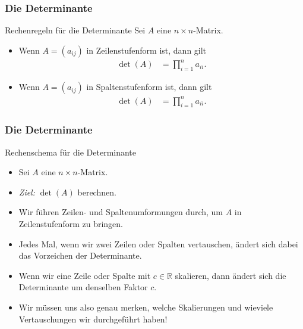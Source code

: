 \documentclass{beamer}
\renewcommand{\emph}[1]{{\textcolor{solarizedRed}{\itshape #1}}}
\newcommand\RR{\mathbb R}
\renewcommand{\ae}{\"a}
\newcommand{\ue}{\"u}
\newcommand{\mytitle}{Die Determinante}
\begin{document}
\begin{frame}\frametitle{\mytitle}
	\begin{block}{Rechenregeln f\ue r die Determinante}
		Sei $A$ eine $n\times n$-Matrix.
		\begin{itemize}
			\item Wenn $A=(a_{ij})$ in Zeilenstufenform ist, dann gilt
				\begin{align*}
					\det(A)&=\prod_{i=1}^na_{ii}.
				\end{align*}
			\item Wenn $A=(a_{ij})$ in Spaltenstufenform ist, dann gilt
				\begin{align*}
					\det(A)&=\prod_{i=1}^na_{ii}.
				\end{align*}
		\end{itemize}
	\end{block}
\end{frame}

\begin{frame}\frametitle{\mytitle}
	\begin{block}{Rechenschema f\ue r die Determinante}
		\begin{itemize}
			\item Sei $A$ eine $n\times n$-Matrix.
			\item \emph{Ziel:} $\det(A)$ berechnen.
			\item Wir f\ue hren Zeilen- und Spaltenumformungen durch, um $A$ in Zeilenstufenform zu bringen.
			\item Jedes Mal, wenn wir zwei Zeilen oder Spalten vertauschen, \ae ndert sich dabei das Vorzeichen der Determinante.
			\item Wenn wir eine Zeile oder Spalte mit $c\in\RR$ skalieren, dann \ae ndert sich die Determinante um denselben Faktor $c$.
			\item Wir m\ue ssen uns also genau merken, welche Skalierungen  und wieviele Vertauschungen wir durchgef\ue hrt haben!
		\end{itemize}
	\end{block}
\end{frame}
\end{document}
